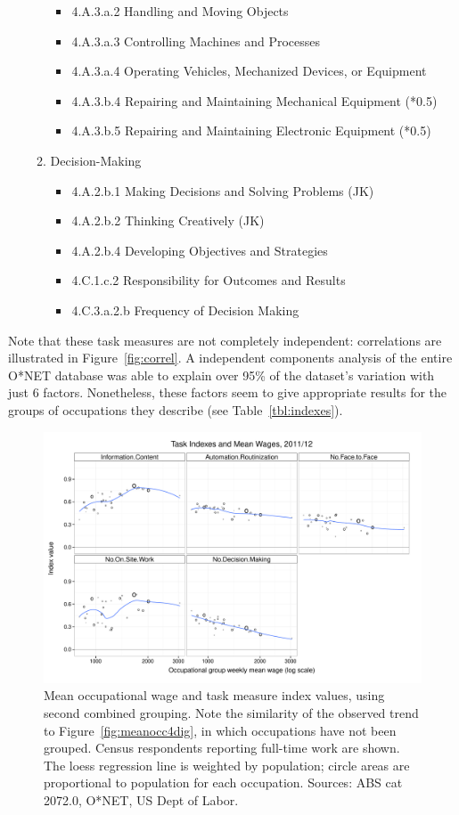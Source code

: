 \begin{enumerate}[A.]
\begin{enumerate}[1.]
\begin{itemize}
  \item 4.A.3.a.2 Handling and Moving Objects 
  \item 4.A.3.a.3 Controlling Machines and Processes 
  \item 4.A.3.a.4 Operating Vehicles, Mechanized Devices, or Equipment 
  \item 4.A.3.b.4 Repairing and Maintaining Mechanical Equipment (*0.5) 
  \item 4.A.3.b.5 Repairing and Maintaining Electronic Equipment (*0.5)
\end{itemize}
\item Decision-Making 
\begin{itemize}
\item 4.A.2.b.1 Making Decisions and Solving Problems (JK) 
\item 4.A.2.b.2 Thinking Creatively (JK) 
\item 4.A.2.b.4 Developing Objectives and Strategies 
\item 4.C.1.c.2 Responsibility for Outcomes and Results 
\item 4.C.3.a.2.b Frequency of Decision Making
\end{itemize}
\end{enumerate}
\end{enumerate}

Note that these task measures are not completely independent: correlations are illustrated in Figure~\ref{fig:correl}. A independent components analysis of the entire O*NET database was able to explain over 95\% of the dataset's variation with just 6 factors. Nonetheless, these factors seem to give appropriate results for the groups of occupations they describe (see Table~\ref{tbl:indexes}).

\begin{figure}[ht]
  \centering
  \includegraphics[width=\textwidth]{../figure/wages_indexes.pdf}
  \caption{Mean occupational wage and task measure index values, using second combined grouping. Note the similarity of the observed trend to Figure~\ref{fig:meanocc4dig}, in which occupations have not been grouped. Census respondents reporting full-time work are shown. The loess regression line is weighted by population; circle areas are proportional to population for each occupation. Sources: ABS cat 2072.0, O*NET, US Dept of Labor.}
  \label{fig:meanocc2}
\end{figure}

